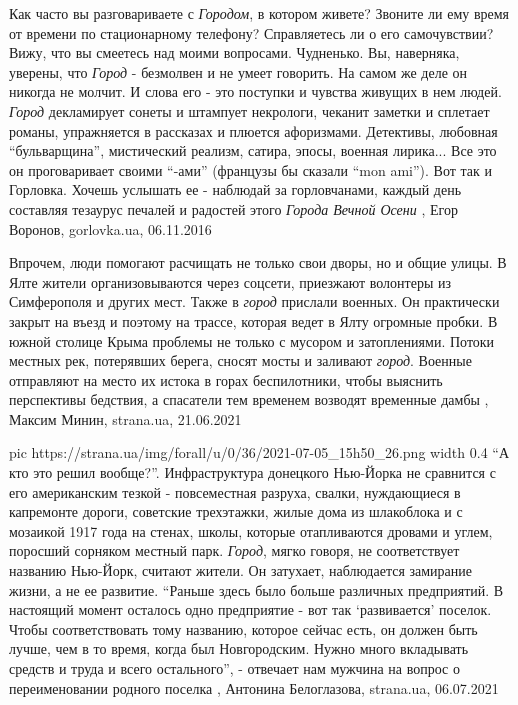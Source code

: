 Как часто вы разговариваете с \emph{Городом}, в котором живете? Звоните ли ему
время от времени по стационарному телефону? Справляетесь ли о его самочувствии?
Вижу, что вы смеетесь над моими вопросами.  Чудненько. Вы, наверняка, уверены,
что \emph{Город} - безмолвен и не умеет говорить. На самом же деле он никогда
не молчит.  И слова его - это поступки и чувства живущих в нем людей.
\emph{Город} декламирует сонеты и штампует некрологи, чеканит заметки и
сплетает романы, упражняется в рассказах и плюется афоризмами. Детективы,
любовная \enquote{бульварщина}, мистический реализм, сатира, эпосы, военная
лирика...  Все это он проговаривает своими \enquote{-ами} (французы бы
сказали \enquote{mon ami}). Вот так и Горловка. Хочешь услышать ее - наблюдай
за горловчанами, каждый день составляя тезаурус печалей и радостей этого
\emph{Города Вечной Осени}
, 
Егор Воронов, gorlovka.ua, 06.11.2016

Впрочем, люди помогают расчищать не только свои дворы, но и общие улицы. В Ялте
жители организовываются через соцсети, приезжают волонтеры из Симферополя и
других мест. Также в \emph{город} прислали военных. Он практически закрыт на
въезд и поэтому на трассе, которая ведет в Ялту огромные пробки.  В южной
столице Крыма проблемы не только с мусором и затоплениями. Потоки местных рек,
потерявших берега, сносят мосты и заливают \emph{город}. Военные отправляют на
место их истока в горах беспилотники, чтобы выяснить перспективы бедствия, а
спасатели тем временем возводят временные дамбы
, 
Максим Минин, strana.ua, 21.06.2021

\ifcmt
  pic https://strana.ua/img/forall/u/0/36/2021-07-05_15h50_26.png
	width 0.4
\fi
\enquote{А кто это решил вообще?}.  Инфраструктура донецкого Нью-Йорка не сравнится с
его американским тезкой - повсеместная разруха, свалки, нуждающиеся в
капремонте дороги, советские трехэтажки, жилые дома из шлакоблока и с мозаикой
1917 года на стенах, школы, которые отапливаются дровами и углем, поросший
сорняком местный парк.  \emph{Город}, мягко говоря, не соответствует названию
Нью-Йорк, считают жители. Он затухает, наблюдается замирание жизни, а не ее
развитие.  \enquote{Раньше здесь было больше различных предприятий. В настоящий
момент осталось одно предприятие - вот так \enquote{развивается} поселок. Чтобы
соответствовать тому названию, которое сейчас есть, он должен быть лучше, чем в
то время, когда был Новгородским. Нужно много вкладывать средств и труда и
всего остального}, - отвечает нам мужчина на вопрос о переименовании родного
поселка
, 
Антонина Белоглазова, strana.ua, 06.07.2021

